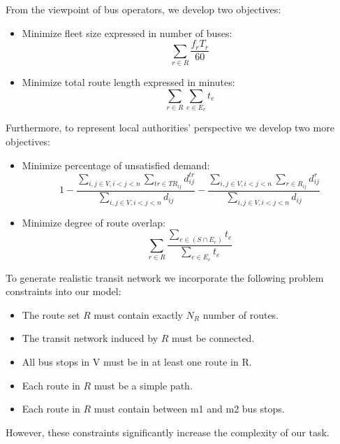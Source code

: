 From the viewpoint of bus operators, we develop two objectives:
\begin{itemize}

	\item Minimize fleet size expressed in number of buses:
	\begin{equation}
	\sum_{r \in R} \frac{f_rT_r}{60}
	\end{equation}

	\item Minimize total route length expressed in minutes:
	\begin{equation}
	\sum_{r \in R}\sum_{e \in E_r} t_e
	\end{equation}
\end{itemize}

Furthermore, to represent local authorities' perspective we develop two more objectives:
\begin{itemize}
	\item Minimize percentage of unsatisfied demand:
	\begin{equation}
	1 - \dfrac{\sum_{i,j \in V, i<j<n} \sum_{tr \in TR_{ij}} d_{ij}^{tr}}{\sum_{i,j \in V, i<j<n} d_{ij}} - \dfrac{\sum_{i,j \in V, i<j<n} \sum_{r \in R_{ij}} d_{ij}^r}{\sum_{i,j \in V, i<j<n} d_{ij}}
	\end{equation}

	\item Minimize degree of route overlap:
	\begin{equation}
	\sum_{r \in R}\dfrac{\sum_{e \in (S \cap E_r)}t_e}{\sum_{e \in E_r}t_e}
	\end{equation}
\end{itemize}


To generate realistic transit network we incorporate the following problem constraints into our model:
\begin{itemize}
	\item The route set $ R $ must contain exactly $ N_R $ number of routes.
	\item The transit network induced by $ R $ must be connected.
	\item All bus stops in V must be in at least one route in R.
	\item Each route in $ R $ must be a simple path.
	\item Each route in $ R $ must contain between m1 and m2 bus stops.
\end{itemize}

However, these constraints significantly increase the complexity of our task.


